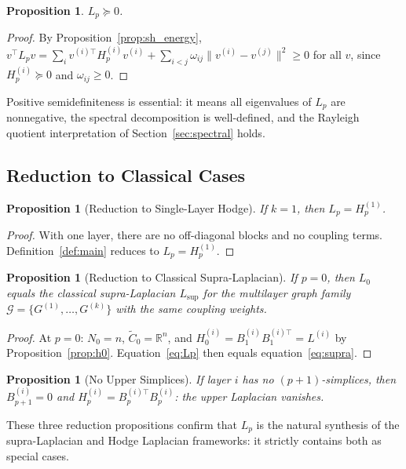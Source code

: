 \documentclass[11pt]{article}
\newtheorem{proposition}[theorem]{Proposition}
\theoremstyle{definition}
\theoremstyle{remark}
\newcommand{\R}{\mathbb{R}}
\newcommand{\Lsup}{L_{\mathrm{sup}}}
\newcommand{\Ctil}{\widetilde{C}}
\newcommand{\calG}{\mathcal{G}}
\begin{document}
\begin{proposition}
$L_p \succeq 0$.
\end{proposition}

\begin{proof}
By Proposition~\ref{prop:sh_energy},
$v^\top L_p v = \sum_i v^{(i)\top}H_p^{(i)}v^{(i)} +
\sum_{i<j}\omega_{ij}\|v^{(i)}-v^{(j)}\|^2 \geq 0$ for all $v$, since
$H_p^{(i)}\succeq 0$ and $\omega_{ij}\geq 0$.
\end{proof}

Positive semidefiniteness is essential: it means all eigenvalues of $L_p$ are
nonnegative, the spectral decomposition is well-defined, and the Rayleigh
quotient interpretation of Section~\ref{sec:spectral} holds.

\subsection{Reduction to Classical Cases}

\begin{proposition}[Reduction to Single-Layer Hodge]
\label{prop:k1}
If $k=1$, then $L_p = H_p^{(1)}$.
\end{proposition}

\begin{proof}
With one layer, there are no off-diagonal blocks and no coupling terms.
Definition~\ref{def:main} reduces to $L_p = H_p^{(1)}$.
\end{proof}

\begin{proposition}[Reduction to Classical Supra-Laplacian]
\label{prop:p0}
If $p=0$, then $L_0$ equals the classical supra-Laplacian $\Lsup$ for the
multilayer graph family $\calG = \{G^{(1)},\dots,G^{(k)}\}$ with the same
coupling weights.
\end{proposition}

\begin{proof}
At $p=0$: $N_0 = n$, $\Ctil_0 = \R^n$, and $H_0^{(i)} = B_1^{(i)}B_1^{(i)\top}
= L^{(i)}$ by Proposition~\ref{prop:h0}. Equation~\eqref{eq:Lp} then equals
equation~\eqref{eq:supra}.
\end{proof}

\begin{proposition}[No Upper Simplices]
If layer $i$ has no $(p+1)$-simplices, then $B_{p+1}^{(i)}=0$ and
$H_p^{(i)} = B_p^{(i)\top}B_p^{(i)}$: the upper Laplacian vanishes.
\end{proposition}

These three reduction propositions confirm that $L_p$ is the natural synthesis
of the supra-Laplacian and Hodge Laplacian frameworks: it strictly contains both
as special cases.
\end{document}
